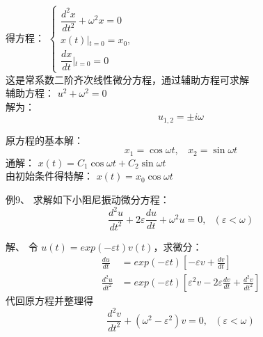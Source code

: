 \begin{frame}	
	得方程：
	$\displaystyle \begin{cases}
	\dfrac{d ^2 x}{d t^2} +\omega ^2 x = 0	\\
	x(t)\left |_{t=0}  =x_0  \right. , \\
	 \dfrac{dx}{dt} \left |_{t=0}  =0 \right.      	
	\end{cases}$\\
	这是常系数二阶齐次线性微分方程，通过辅助方程可求解\\ 
	辅助方程： $u^2+\omega ^2=0$ \\
	解为：
	\begin{equation*}
		u_{1, 2} =\pm i\omega     
	\end{equation*}
\end{frame}

\begin{frame}
	原方程的基本解： 
	\begin{equation*}
		x_{1} =\cos \omega t  , ~~~~	x_{2} =\sin \omega t     
	\end{equation*}
	通解： $x(t)=C_1 \cos \omega t +C_2 \sin \omega t $ \\  	\vspace{0.6cm}
	由初始条件得特解： $x(t)=x_0 \cos \omega t $ \\
\end{frame}

\begin{frame}
	\begin{exampleblock} {例9、	求解如下小阻尼振动微分方程：}
	\begin{equation*}
		\frac{d^2 u}{d t^2} +2\varepsilon \frac{d u}{dt} +\omega ^2 u = 0 ,  ~~~ (\varepsilon < \omega)   
	\end{equation*}
	\end{exampleblock} 
	\alert{解、} 令 $\displaystyle  u(t)= exp(-\varepsilon t) v(t) $，求微分：	
	\begin{align*}
		\frac{d u}{d t } & =exp(-\varepsilon t) [-\varepsilon v +\frac{d v}{dt}]\\
		\frac{d^2 u}{d t^2 } & =exp(-\varepsilon t) [\varepsilon ^2 v -2\varepsilon \frac{d v}{dt}+ \frac{d^2 v}{dt^2} ]
	\end{align*}
	代回原方程并整理得
	\begin{equation*}
		\frac{d^2 v}{d t^2} +(\omega ^2 - \varepsilon ^2) v = 0,  ~~~ (\varepsilon < \omega)   
	\end{equation*}
\end{frame}

